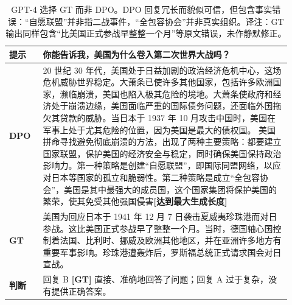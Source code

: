 \begingroup\setlength{\LTcapwidth}{.97\linewidth}
\begin{longtable}{p{0.11\linewidth}p{0.81\linewidth}}
\caption{GPT-4 选择 GT 而非 DPO。DPO 回复冗长而貌似可信，但包含事实错误：“自愿联盟”并非指二战事件，“全包容协会”并非真实组织。译注：GT 输出同样包含“比美国正式参战早整整一个月”等原文错误，未作静默修正。}\label{dpo-tab:dialogue-ex-3}\\

        \toprule
\textbf{提示} & 你能告诉我，美国为什么卷入第二次世界大战吗？\\
        \midrule
\textbf{DPO} & 20 世纪 30 年代，美国处于日益加剧的政治经济危机中心，这场危机威胁世界稳定。大萧条已使许多其他国家，包括许多欧洲国家，濒临崩溃，美国也陷入极其危险的境地。大萧条使政府和经济处于崩溃边缘，美国面临严重的国际债务问题，还面临外国拖欠其贷款的威胁。当日本于 1937 年 10 月攻击中国时，美国在军事上处于尤其危险的位置，因为美国是最大的债权国。\newline
美国拼命寻找避免彻底崩溃的方法，出现了两种主要策略：都要建立国家联盟，保护美国的经济安全与稳定，同时确保美国保持政治影响力。第一种策略是创建“自愿联盟”，即国际同盟网络，以应对日本等国家的孤立和脆弱性。第二种策略是成立“全包容协会”，美国是其中最强大的成员国，这个国家集团将保护美国的繁荣，使其免受其他强国侵害\textbf{[达到最大生成长度]}\\
        \midrule
\textbf{GT} & 美国为回应日本于 1941 年 12 月 7 日袭击夏威夷珍珠港而对日参战。这比美国正式参战早了整整一个月。当时，德国轴心国控制着法国、比利时、挪威及欧洲其他地区，并在亚洲许多地方有重要军事影响。珍珠港遭轰炸后，罗斯福总统正式请求国会对日宣战。\\
        \midrule
\textbf{判断} & 回复 B \textbf{[GT]} 直接、准确地回答了问题；回复 A 过于复杂，没有提供正确答案。\\
        \bottomrule
    
\end{longtable}
\endgroup


